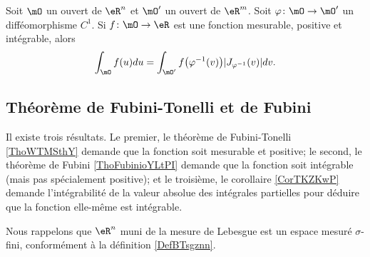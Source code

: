 \begin{theorem} \label{ThomFeRCi}
    Soit \( \mO\) un ouvert de \( \eR^n\) et \( \mO'\) un ouvert de \( \eR^m\). Soit \( \varphi\colon \mO\to \mO'\) un difféomorphisme \( C^1\). Si \( f\colon \mO\to \eR\) est une fonction mesurable, positive et intégrable, alors
    \begin{equation}
        \int_{\mO}f(u)du=\int_{\mO'}f\big( \varphi^{-1}(v) \big)| J_{\varphi^{-1}}(v) |dv.
    \end{equation}
\end{theorem}

\subsection{Théorème de Fubini-Tonelli et de Fubini}

Il existe trois résultats. Le premier, le théorème de Fubini-Tonelli \ref{ThoWTMSthY} demande que la fonction soit mesurable et positive; le second, le théorème de Fubini \ref{ThoFubinioYLtPI} demande que la fonction soit intégrable (mais pas spécialement positive); et le troisième, le corollaire \ref{CorTKZKwP} demande l'intégrabilité de la valeur absolue des intégrales partielles pour déduire que la fonction elle-même est intégrable.


Nous rappelons que \( \eR^n\) muni de la mesure de Lebesgue est un espace mesuré \( \sigma\)-fini, conformément à la définition \ref{DefBTsgznn}.


